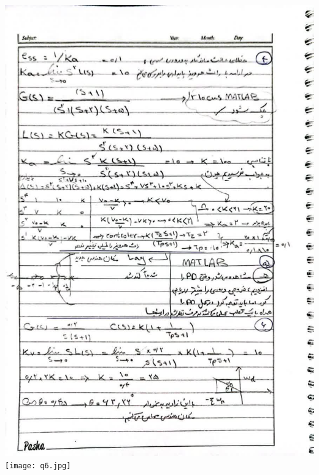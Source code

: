 \documentclass[a4,12pt]{article}
\begin{document}
			\includegraphics[width=15cm]{q4,5,6.jpg}
			\texttt{[image: q6.jpg]}
		
\end{document}
